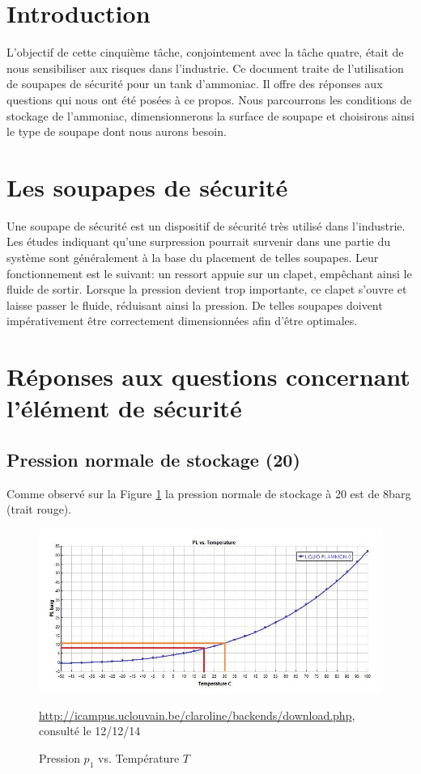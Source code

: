 \section {Introduction}

L'objectif de cette cinquième tâche, conjointement avec la tâche quatre, était de nous sensibiliser aux risques dans l'industrie. Ce document traite de l'utilisation de soupapes de sécurité pour un tank d'ammoniac. Il offre des réponses aux questions qui nous ont été posées à ce propos. Nous parcourrons les conditions de stockage de l'ammoniac, dimensionnerons la surface de soupape et choisirons ainsi le type de soupape dont nous aurons besoin.

\section{Les soupapes de sécurité}
Une soupape de sécurité est un dispositif de sécurité très utilisé dans l'industrie. Les études  indiquant qu'une surpression pourrait survenir dans une partie du système sont généralement à la base du placement de telles soupapes. Leur fonctionnement est le suivant: un ressort appuie sur un clapet, empêchant ainsi le fluide de sortir. Lorsque la pression devient trop importante, ce clapet s'ouvre et laisse passer le fluide, réduisant ainsi la pression. De telles soupapes doivent impérativement être correctement dimensionnées afin d'être optimales.

\section{Réponses aux questions concernant l'élément de sécurité}
\subsection{Pression normale de stockage (\unit{20}{\celsius})}

Comme observé sur la Figure \ref{graph1} la pression normale de stockage à \unit{20}{\celsius} est de \unit{8}{barg} (trait rouge).

\begin{figure}[ht!]
\centering
\includegraphics[scale=0.4]{tache5.jpg}
\caption{Pression $p_1$ vs. Température $T$}
\small \url{http://icampus.uclouvain.be/claroline/backends/download.php}, consulté le 12/12/14
\label{graph1}
\end{figure}

